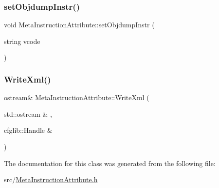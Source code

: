 \mbox{\label{classMetaInstructionAttribute_a9fc979d829aaf9598c58a22f482ce134}} 
\subsubsection{\texorpdfstring{set\+Objdump\+Instr()}{setObjdumpInstr()}}
{\footnotesize\ttfamily void Meta\+Instruction\+Attribute\+::set\+Objdump\+Instr (\begin{DoxyParamCaption}\item[{string}]{vcode }\end{DoxyParamCaption})}

\mbox{\label{classMetaInstructionAttribute_a6b4f27589f0fc145ed4c23c5763f5930}} 
\subsubsection{\texorpdfstring{Write\+Xml()}{WriteXml()}}
{\footnotesize\ttfamily ostream\& Meta\+Instruction\+Attribute\+::\+Write\+Xml (\begin{DoxyParamCaption}\item[{std\+::ostream \&}]{,  }\item[{cfglib\+::\+Handle \&}]{ }\end{DoxyParamCaption})}



The documentation for this class was generated from the following file\+:\begin{DoxyCompactItemize}
\item 
src/\hyperlink{MetaInstructionAttribute_8h}{Meta\+Instruction\+Attribute.\+h}\end{DoxyCompactItemize}

